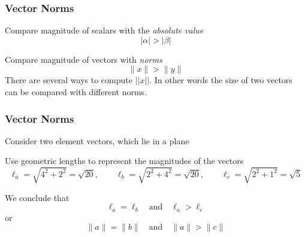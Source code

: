 \documentclass[10pt]{beamer}
\newcommand{\norm}[1]{{\ensuremath{{\|#1\|}}}}
\begin{document}
\begin{frame}
\frametitle{Vector Norms}

Compare magnitude of scalars with the \emph{absolute value}
\begin{equation*}
    \bigl| \alpha \bigr|  >  \bigl| \beta \bigr|
\end{equation*}


Compare magnitude of vectors with \emph{norms}
\begin{equation*}
    \norm{x} > \norm{y}
\end{equation*}
There are several ways to compute $||x||$.  In other words
the size of two vectors can be compared with different norms.



\end{frame}
\begin{frame}
\frametitle{Vector Norms}

Consider two element vectors, which lie in a plane
\begin{center}
    \qquad
\end{center}
Use geometric lengths to represent the magnitudes of the vectors
\begin{equation*}
    \ell_a = \sqrt{4^2 + 2^2} = \sqrt{20},\qquad
    \ell_b = \sqrt{2^2 + 4^2} = \sqrt{20},\qquad
    \ell_c = \sqrt{2^2 + 1^2} = \sqrt{5}
\end{equation*}

We conclude that
\begin{equation*}
    \ell_a = \ell_b
    \quad
    \text{and}
    \quad
    \ell_a > \ell_c
\end{equation*}
or
\begin{equation*}
    \norm{a} = \norm{b}
    \quad
    \text{and}
    \quad
    \norm{a} > \norm{c}
\end{equation*}



\end{frame}
\end{document}
